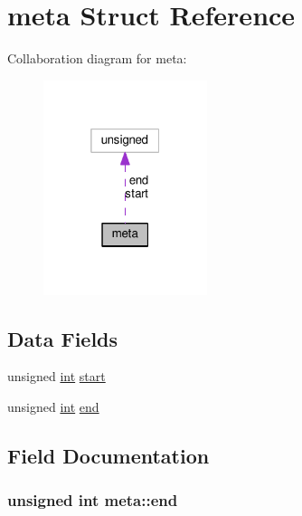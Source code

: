 \hypertarget{structmeta}{}\section{meta Struct Reference}
\label{structmeta}


Collaboration diagram for meta\+:
\nopagebreak
\begin{figure}[H]
\begin{center}
\leavevmode
\includegraphics[width=136pt]{structmeta__coll__graph}
\end{center}
\end{figure}
\subsection*{Data Fields}
\begin{DoxyCompactItemize}
\item 
unsigned \hyperlink{pcre_8txt_a42dfa4ff673c82d8efe7144098fbc198}{int} \hyperlink{structmeta_a35fdd424f7223e4c37f8dbc0c3362252}{start}
\item 
unsigned \hyperlink{pcre_8txt_a42dfa4ff673c82d8efe7144098fbc198}{int} \hyperlink{structmeta_af3185769158a229a879590f065a709dc}{end}
\end{DoxyCompactItemize}


\subsection{Field Documentation}
\subsubsection[{\texorpdfstring{end}{end}}]{\setlength{\rightskip}{0pt plus 5cm}unsigned {\bf int} meta\+::end}\hypertarget{structmeta_af3185769158a229a879590f065a709dc}{}\label{structmeta_af3185769158a229a879590f065a709dc}
